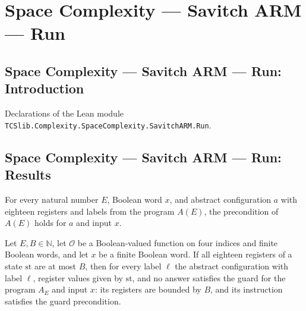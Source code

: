 \section{Space Complexity --- Savitch ARM --- Run}
\subsection*{Space Complexity --- Savitch ARM --- Run: Introduction}

Declarations of the Lean module \texttt{TCSlib.Complexity.SpaceComplexity.SavitchARM.Run}.

\subsection*{Space Complexity --- Savitch ARM --- Run: Results}

\begin{lemma}
\label{Complexity.LogProg.SavitchARM.preS_A}
\leanok
{}
For every natural number $E$, Boolean word $x$, and abstract configuration $a$ with
eighteen registers and labels from the program $A(E)$, the precondition of $A(E)$ holds
for $a$ and input $x$.
\end{lemma}

\begin{lemma}
\label{Complexity.LogProg.SavitchARM.gb_of}
\leanok
{}
Let $E,B\in\mathbb{N}$, let $\mathcal{O}$ be a Boolean-valued function on four indices
and finite Boolean words, and let $x$ be a finite Boolean word. If all eighteen
registers of a state $\mathrm{st}$ are at most $B$, then for every label $\ell$ the
abstract configuration with label $\ell$, register values given by $\mathrm{st}$, and no
answer satisfies the guard for the program $A_E$ and input $x$: its registers are
bounded by $B$, and its instruction satisfies the guard precondition.
\end{lemma}


